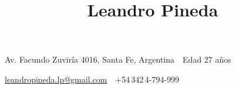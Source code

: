 \documentclass[letterpaper,MMMyyyy,nonstop]{simpleresumecv}
\newcommand{\CVAuthor}{Leandro Pineda}
\begin{document}

\title{\CVAuthor}
\vspace{.5cm}
\begin{subtitle}
Av. Facundo Zuviría 4016, Santa Fe, Argentina\, \SubBulletSymbol\, Edad 27 años
\par
\hspace{-4cm}\href{mailto:leandropineda.lp@gmail.com}
{leandropineda.lp@gmail.com}
\,\SubBulletSymbol\,
+54\,342\,4-794-999
\end{subtitle}
 
\hspace{14.5cm}
\end{document}
